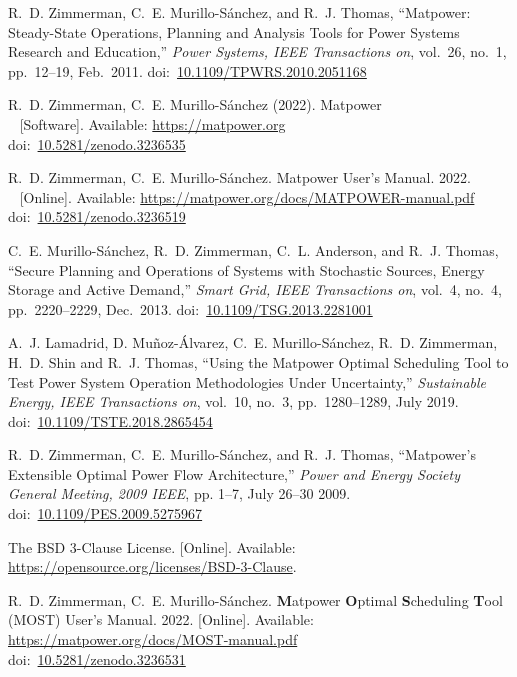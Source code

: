 \documentclass[12pt]{article}
\newcommand{\matpower}[0]{{\sc Matpower}}
\newcommand{\most}[0]{{MOST}}
\newcommand{\mostname}[0]{{{\bf M}{\sc atpower} \textbf{O}ptimal \textbf{S}cheduling \textbf{T}ool}}
\newcommand{\doi}[1]{doi:~\href{https://doi.org/#1}{#1}}
\numberwithin{equation}{section}
\numberwithin{table}{section}
\numberwithin{figure}{section}
\begin{document}
\clearpage
\begin{thebibliography}{99}
R.~D. Zimmerman, C.~E. Murillo-S{\'a}nchez, and R.~J. Thomas,
  ``\matpower{}: Steady-State Operations, Planning and Analysis Tools for Power Systems Research and Education,'' \emph{Power Systems, IEEE Transactions on}, vol.~26, no.~1, pp.~12--19, Feb.~2011.
\doi{10.1109/TPWRS.2010.2051168}

R.~D. Zimmerman, C.~E. Murillo-S{\'a}nchez (2022). \matpower{}\\~
[Software]. Available: \url{https://matpower.org}\\
\doi{10.5281/zenodo.3236535}

R.~D. Zimmerman, C.~E. Murillo-S{\'a}nchez. \matpower{} User's Manual. 2022.\\~
[Online]. Available: \url{https://matpower.org/docs/MATPOWER-manual.pdf}\\
\doi{10.5281/zenodo.3236519}

C.~E. Murillo-S{\'a}nchez, R.~D. Zimmerman, C.~L. Anderson, and R.~J. Thomas, ``Secure Planning and Operations of Systems with Stochastic Sources, Energy Storage and Active Demand,'' \emph{Smart Grid, IEEE Transactions on}, vol.~4, no.~4, pp.~2220--2229, Dec.~2013.
\doi{10.1109/TSG.2013.2281001}

A.~J. Lamadrid, D. Mu{\~n}oz-{\'A}lvarez, C.~E. Murillo-S{\'a}nchez, R.~D. Zimmerman, H.~D. Shin and R.~J. Thomas, ``Using the \matpower{} Optimal Scheduling Tool to Test Power System Operation Methodologies Under Uncertainty,'' \emph{Sustainable Energy, IEEE Transactions on}, vol.~10, no.~3, pp.~1280--1289, July 2019.
\doi{10.1109/TSTE.2018.2865454}

R.~D. Zimmerman, C.~E. Murillo-S{\'a}nchez, and R.~J. Thomas, ``\matpower{}'s
Extensible Optimal Power Flow Architecture,'' \emph{Power and Energy Society
General Meeting, 2009 IEEE}, pp. 1--7, July 26--30 2009.
\doi{10.1109/PES.2009.5275967}

The BSD 3-Clause License. [Online]. Available: \url{https://opensource.org/licenses/BSD-3-Clause}.

R.~D. Zimmerman, C.~E. Murillo-S{\'a}nchez. \mostname{} (\most{}) User's Manual. 2022. [Online]. Available: \url{https://matpower.org/docs/MOST-manual.pdf}\\
\doi{10.5281/zenodo.3236531}


\end{thebibliography}
\end{document}
